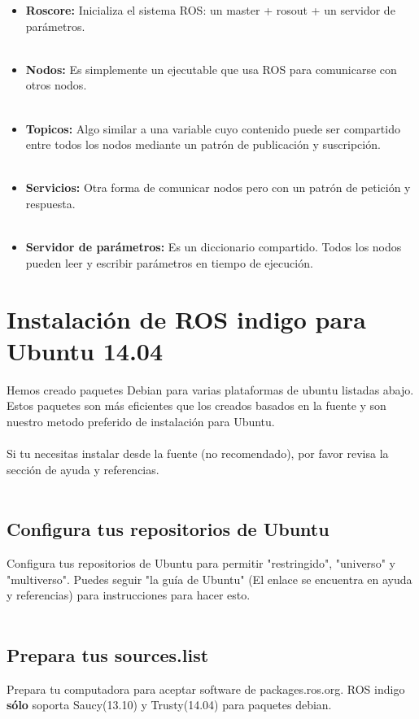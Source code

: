 \documentclass[a4paper]{book}
\begin{document}
\begin{itemize}
\item \textbf{Roscore:} Inicializa el sistema ROS: un master + rosout + un servidor de parámetros.\\
\\	
\item \textbf{Nodos:} Es simplemente un ejecutable que usa ROS para comunicarse con otros nodos.\\
\\
\item \textbf{Topicos:} Algo similar a una variable cuyo contenido puede ser compartido entre todos los nodos mediante un patrón de publicación y suscripción.\\
\\
\item \textbf{Servicios:} Otra forma de comunicar nodos pero con un patrón de petición y respuesta.\\
\\
\item \textbf{Servidor de parámetros:} Es un diccionario compartido. Todos los nodos pueden leer y escribir parámetros en tiempo de ejecución.\\
\end{itemize}
\section{Instalación de ROS indigo para Ubuntu 14.04}
Hemos creado paquetes Debian para varias plataformas de ubuntu listadas abajo. Estos paquetes son más eficientes que los creados basados en la fuente y son nuestro metodo preferido de instalación para Ubuntu.\\
\\
Si tu necesitas instalar desde la fuente (no recomendado), por favor revisa la sección de ayuda y referencias.\\
\\
\subsection{Configura tus repositorios de Ubuntu}
Configura tus repositorios de Ubuntu para permitir "restringido", "universo" y "multiverso". Puedes seguir "la guía de Ubuntu" (El enlace se encuentra en ayuda y referencias) para instrucciones para hacer esto.\\
\\
\subsection{Prepara tus sources.list}
Prepara tu computadora para aceptar software de packages.ros.org. ROS indigo \textbf{sólo} soporta Saucy(13.10) y Trusty(14.04) para paquetes debian.
\end{document}

